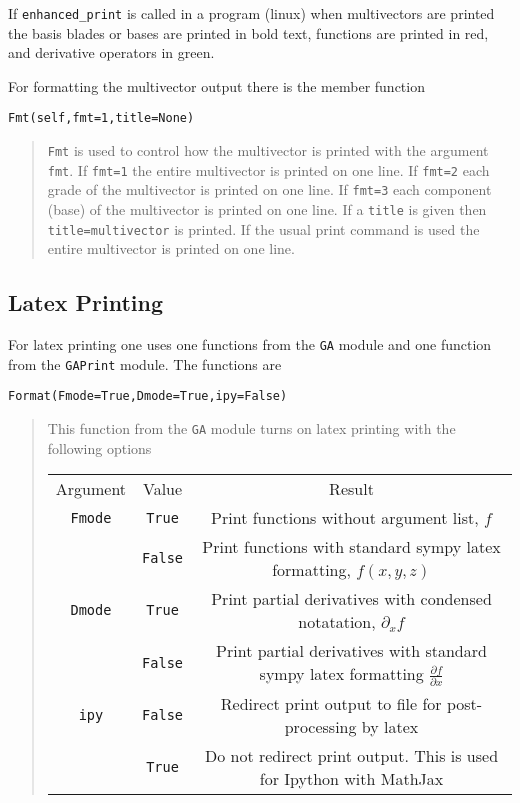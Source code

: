 \documentclass[10pt]{article}
\newcommand{\lp}{\left (}
\newcommand{\rp}{\right )}
\newcommand{\f}[2]{{#1}\lp {#2} \rp}
\newcommand{\T}[1]{\texttt{#1}}
\begin{document}
If \T{enhanced\_print} is called in a program (linux) when multivectors are printed
the basis blades or bases are printed in bold text, functions are printed in red,
and derivative operators in green.

For formatting the multivector output there is the member function

\T{Fmt(self,fmt=1,title=None)}
\begin{quote}
\T{Fmt} is used to control how the multivector is printed with the argument
\T{fmt}.  If \T{fmt=1} the entire multivector is printed on one line.  If
\T{fmt=2} each grade of the multivector is printed on one line.  If \T{fmt=3}
each component (base) of the multivector is printed on one line.  If a
\T{title} is given then \T{title=multivector} is printed.  If the usual print
command is used the entire multivector is printed on one line.
\end{quote}

\subsection{Latex Printing}\label{LatexPrinting}

For latex printing one uses one functions from the \T{GA} module and one
function from the \T{GAPrint} module.  The
functions are

\T{Format(Fmode=True,Dmode=True,ipy=False)}
\begin{quote}
   This function from the \T{GA} module turns on latex printing with the
   following options

\begin{tabular}{ccc}
         Argument &  Value &  Result \\
         \T{Fmode} &  \T{True} &  Print functions without argument list, $f$ \\
               &  \T{False} &  Print functions with standard sympy latex formatting, $\f{f}{x,y,z}$ \\
         \T{Dmode} &  \T{True} &  Print partial derivatives with condensed notatation, $\partial_{x}f$ \\
               &  \T{False} &  Print partial derivatives with standard sympy latex formatting $\frac{\partial f}{\partial x}$ \\
         \T{ipy}   &  \T{False} &  Redirect print output to file for post-processing by latex \\
               &  \T{True} &  Do not redirect print output.  This is used for Ipython with MathJax
\end{tabular}
\end{quote}
\end{document}
